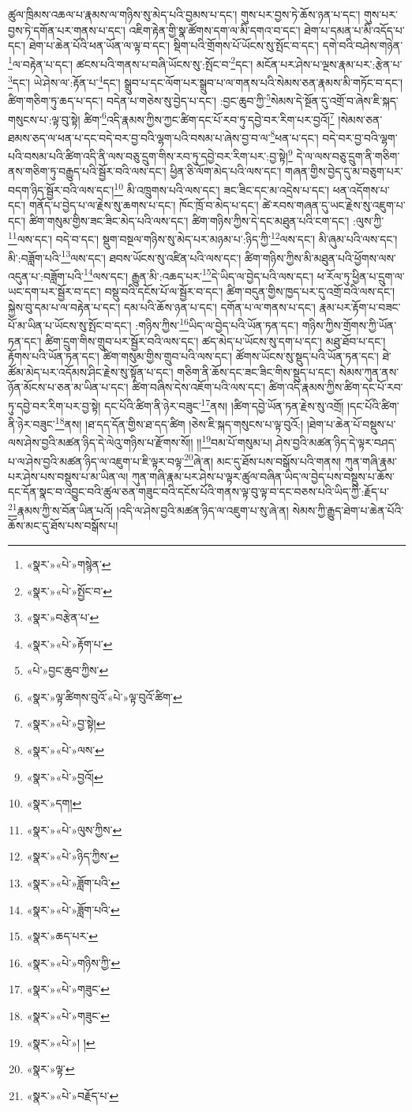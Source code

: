 ཚུལ་ཁྲིམས་འཆལ་པ་རྣམས་ལ་གཉིས་སུ་མེད་པའི་བྱམས་པ་དང་། གུས་པར་བྱས་ཏེ་ཆོས་ཉན་པ་དང་། གུས་པར་བྱས་ཏེ་དགོན་པར་གནས་པ་དང་། འཇིག་རྟེན་གྱི་སྣ་ཚོགས་དག་ལ་མི་དགའ་བ་དང་། ཐེག་པ་དམན་པ་མི་འདོད་པ་དང་། ཐེག་པ་ཆེན་པོའི་ཕན་ཡོན་ལ་ལྟ་བ་དང་། སྡིག་པའི་གྲོགས་པོ་ཡོངས་སུ་སྤོང་བ་དང་། དགེ་བའི་བཤེས་གཉེན་\footnote{«སྣར་»«པེ་»གསྙེན་}ལ་བརྟེན་པ་དང་། ཚངས་པའི་གནས་པ་བཞི་ཡོངས་སུ་:སྤོང་བ་\footnote{«སྣར་»«པེ་»སྤྱོང་བ་}དང་། མངོན་པར་ཤེས་པ་ལྔས་རྣམ་པར་:རྩེན་པ་\footnote{«སྣར་»བརྩེན་པ་}དང་། ཡེ་ཤེས་ལ་:རྟོན་པ་\footnote{«སྣར་»«པེ་»རྟོག་པ་}དང་། སྒྲུབ་པ་དང་ལོག་པར་སྒྲུབ་པ་ལ་གནས་པའི་སེམས་ཅན་རྣམས་མི་གཏོང་བ་དང་། ཚིག་གཅིག་ཏུ་ཆད་པ་དང་། བདེན་པ་གཅེས་སུ་བྱེད་པ་དང་། :བྱང་ཆུབ་ཀྱི་\footnote{«པེ་»བྱང་ཆུབ་ཀྱིས་}སེམས་དེ་སྔོན་དུ་འགྲོ་བ་ཞེས་ཇི་སྐད་གསུངས་པ་:ལྟ་བུ་སྟེ། ཚིག་\footnote{«སྣར་»ལྟ་ཚིགས་བུའོ་«པེ་»ལྟ་བུའོ་ཚིག་}འདི་རྣམས་ཀྱིས་ཀྱང་ཚིག་དང་པོ་རབ་ཏུ་དབྱེ་བར་རིག་པར་བྱའོ།\footnote{«སྣར་»«པེ་»བྱ་སྟེ།} །སེམས་ཅན་ཐམས་ཅད་ལ་ཕན་པ་དང་བདེ་བར་བྱ་བའི་ལྷག་པའི་བསམ་པ་ཞེས་བྱ་བ་ལ་\footnote{«སྣར་»«པེ་»ལས་}ཕན་པ་དང་། བདེ་བར་བྱ་བའི་ལྷག་པའི་བསམ་པའི་ཚིག་འདི་ནི་ལས་བཅུ་དྲུག་གིས་རབ་ཏུ་དབྱེ་བར་རིག་པར་:བྱ་སྟེ།\footnote{«སྣར་»«པེ་»བྱའོ།} དེ་ལ་ལས་བཅུ་དྲུག་ནི་གཅིག་ནས་གཅིག་ཏུ་བརྒྱུད་པའི་སྦྱོར་བའི་ལས་དང་། ཕྱིན་ཅི་ལོག་མེད་པའི་ལས་དང་། གཞན་གྱིས་བྱེད་དུ་མ་བཅུག་པར་བདག་ཉིད་སྦྱོར་བའི་ལས་དང་།\footnote{«སྣར་»དག།} མི་འཁྲུགས་པའི་ལས་དང་། ཟང་ཟིང་དང་མ་འདྲེས་པ་དང་། ཕན་འདོགས་པ་དང་། གནོད་པ་བྱེད་པ་ལ་རྗེས་སུ་ཆགས་པ་དང་། ཁོང་ཁྲོ་བ་མེད་པ་དང་། ཚེ་རབས་གཞན་དུ་ཡང་རྗེས་སུ་འཇུག་པ་དང་། ཚིག་གསུམ་གྱིས་ཟང་ཟིང་མེད་པའི་ལས་དང་། ཚིག་གཉིས་ཀྱིས་དེ་དང་མཐུན་པའི་ངག་དང་། :ལུས་ཀྱི་\footnote{«སྣར་»«པེ་»ལུས་ཀྱིས་}ལས་དང་། བདེ་བ་དང་། སྡུག་བསྔལ་གཉིས་སུ་མེད་པར་མཉམ་པ་:ཉིད་ཀྱི་\footnote{«སྣར་»«པེ་»ཉིད་ཀྱིས་}ལས་དང་། མི་ཞུམ་པའི་ལས་དང་། མི་:བཟློག་པའི་\footnote{«སྣར་»«པེ་»ཟློག་པའི་}ལས་དང་། ཐབས་ཡོངས་སུ་འཛིན་པའི་ལས་དང་། ཚིག་གཉིས་ཀྱིས་མི་མཐུན་པའི་ཕྱོགས་ལས་འདུན་པ་:བཟློག་པའི་\footnote{«སྣར་»«པེ་»ཟློག་པའི་}ལས་དང་། རྒྱུན་མི་:འཆད་པར་\footnote{«སྣར་»ཆད་པར་}དེ་ཡིད་ལ་བྱེད་པའི་ལས་དང་། ཕ་རོལ་ཏུ་ཕྱིན་པ་དྲུག་ལ་ཡང་དག་པར་སྦྱོར་བ་དང་། བསྡུ་བའི་དངོས་པོ་ལ་སྦྱོར་བ་དང་། ཚིག་བདུན་གྱིས་ཁྱད་པར་དུ་འགྲོ་བའི་ལས་དང་། སྐྱེས་བུ་དམ་པ་ལ་བརྟེན་པ་དང་། དམ་པའི་ཆོས་ཉན་པ་དང་། དགོན་པ་ལ་གནས་པ་དང་། རྣམ་པར་རྟོག་པ་བཟང་པོ་མ་ཡིན་པ་ཡོངས་སུ་སྤོང་བ་དང་། :གཉིས་ཀྱིས་\footnote{«སྣར་»«པེ་»གཉིས་ཀྱི་}ཡིད་ལ་བྱེད་པའི་ཡོན་ཏན་དང་། གཉིས་ཀྱིས་གྲོགས་ཀྱི་ཡོན་ཏན་དང་། ཚིག་དྲུག་གིས་གྲུབ་པར་སྦྱོར་བའི་ལས་དང་། ཚད་མེད་པ་ཡོངས་སུ་དག་པ་དང་། མཐུ་ཐོབ་པ་དང་། རྟོགས་པའི་ཡོན་ཏན་དང་། ཚིག་གསུམ་གྱིས་གྲུབ་པའི་ལས་དང་། ཚོགས་ཡོངས་སུ་སྡུད་པའི་ཡོན་ཏན་དང་། ཐེ་ཚོམ་མེད་པར་འདོམས་ཤིང་རྗེས་སུ་སྟོན་པ་དང་། གཅིག་ནི་ཆོས་དང་ཟང་ཟིང་གིས་སྡུད་པ་དང་། སེམས་ཀུན་ནས་ཉོན་མོངས་པ་ཅན་མ་ཡིན་པ་དང་། ཚིག་བཞིས་དེས་འཇོག་པའི་ལས་དང་། ཚིག་འདི་རྣམས་ཀྱིས་ཚིག་དང་པོ་རབ་ཏུ་དབྱེ་བར་རིག་པར་བྱ་སྟེ། དང་པོའི་ཚིག་ནི་ཉེར་བཟུང་\footnote{«སྣར་»«པེ་»གཟུང་}ནས། །ཚིག་དབྱེ་ཡོན་ཏན་རྗེས་སུ་འགྲོ། །དང་པོའི་ཚིག་ནི་ཉེར་བཟུང་\footnote{«སྣར་»«པེ་»གཟུང་}ནས། །ཐ་དད་དོན་གྱིས་ཐ་དད་ཚིག །ཅེས་ཇི་སྐད་གསུངས་པ་ལྟ་བུའོ:། །ཐེག་པ་ཆེན་པོ་བསྡུས་པ་ལས་ཤེས་བྱའི་མཚན་ཉིད་དེ་ལེའུ་གཉིས་པ་རྫོགས་སོ།། །།\footnote{«སྣར་»«པེ་»། །}བམ་པོ་གསུམ་པ། ཤེས་བྱའི་མཚན་ཉིད་དེ་ལྟར་བཤད་པ་ལ་ཤེས་བྱའི་མཚན་ཉིད་ལ་འཇུག་པ་ཇི་ལྟར་བལྟ་\footnote{«སྣར་»ལྟ་}ཞེ་ན། མང་དུ་ཐོས་པས་བསྒོས་པའི་གནས། ཀུན་གཞི་རྣམ་པར་ཤེས་པས་བསྡུས་པ་མ་ཡིན་ལ། ཀུན་གཞི་རྣམ་པར་ཤེས་པ་ལྟར་ཚུལ་བཞིན་ཡིད་ལ་བྱེད་པས་བསྡུས་པ་ཆོས་དང་དོན་སྣང་བ་འབྱུང་བའི་ཚུལ་ཅན་གཟུང་བའི་དངོས་པོའི་གནས་ལྟ་བུ་ལྟ་བ་དང་བཅས་པའི་ཡིད་ཀྱི་:རྗོད་པ་\footnote{«སྣར་»«པེ་»བརྗོད་པ་}རྣམས་ཀྱི་ས་བོན་ཡིན་པའོ། །འདི་ལ་ཤེས་བྱའི་མཚན་ཉིད་ལ་འཇུག་པ་སུ་ཞེ་ན། སེམས་ཀྱི་རྒྱུད་ཐེག་པ་ཆེན་པོའི་ཆོས་མང་དུ་ཐོས་པས་བསྒོས་པ། 